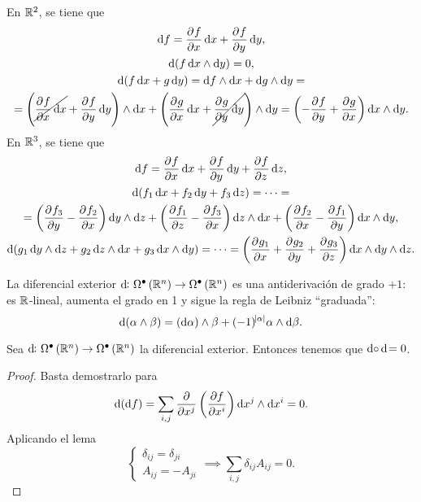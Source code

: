 \begin{example}
    En $\mathbb{R}^2$, se tiene que
    \begin{gather*}
        \dif f = \pdv{f}{x} \dif x + \pdv{f}{y} \dif y, \\
        \dif \left( f \dif x \wedge \dif y \right) = 0, \\
        \dif\left( f \dif x + g \dif y \right) = \dif f \wedge \dif x + \dif g \wedge \dif y =\\=
        \left( \cancel{\pdv{f}{x} \dif x} + \pdv{f}{y} \dif y \right) \wedge \dif x + \left( \pdv{g}{x} \dif x + \cancel{\pdv{g}{y} \dif y} \right)\wedge \dif y =
        \left( -\pdv{f}{y} + \pdv{g}{x} \right) \dif x \wedge \dif y.
    \end{gather*}
    En $\mathbb{R}^3$, se tiene que
    \begin{gather*}
        \dif f = \pdv{f}{x} \dif x + \pdv{f}{y} \dif y + \pdv{f}{z} \dif z, \\
        \dif \left( f_1 \dif x + f_2 \dif y + f_3 \dif z \right) = \cdots = \\ = \left( \pdv{f_3}{y} - \pdv{f_2}{x} \right)\dif y \wedge \dif z +
        \left( \pdv{f_1}{z} - \pdv{f_3}{x} \right) \dif z \wedge \dif x + \left( \pdv{f_2}{x} - \pdv{f_1}{y} \right)\dif x \wedge \dif y, \\
        \dif \left( g_1 \dif y \wedge \dif z +  g_2 \dif z \wedge \dif x + g_3 \dif x \wedge \dif y \right) = \cdots =
        \left( \pdv{g_1}{x} + \pdv{g_2}{y} + \pdv{g_3}{z} \right) \dif x \wedge \dif y \wedge \dif z.
    \end{gather*}
\end{example}

\begin{obs}
    La diferencial exterior $\dif \colon \Omega^\bullet \left( \real^n \right) \to \Omega^\bullet \left( \real^n \right)$ es una antiderivación de
    grado $+1$: es $\mathbb{R}$-lineal, aumenta el grado en 1 y sigue la regla de Leibniz ``graduada'':
    \[
        \dif \left( \alpha \wedge \beta \right) = \left( \dif \alpha \right) \wedge \beta + (-1)^{\abs{\alpha}} \alpha \wedge \dif \beta.
    \]
\end{obs}

\begin{prop}\label{prop:d-cuadrado}
    Sea $\dif \colon \Omega^\bullet \left( \real^n \right) \to \Omega^\bullet \left( \real^n \right)$ la diferencial exterior. Entonces tenemos que $\dif \circ \dif = 0$.
\end{prop}
\begin{proof}
    Basta demostrarlo para
    \[
        \dif \left( \dif f \right) = \sum_{i,j} \frac{\partial}{\partial x^j} \left( \frac{\partial f}{\partial x^i} \right) \dif x^j \wedge \dif x^i = 0.
    \]
    Aplicando el lema
    \[
        \begin{cases}
            \delta_{ij} = \delta_{ji} \\ A_{ij} = - A_{ji}
        \end{cases} \implies
        \sum_{i,j} \delta_{ij} A_{ij} = 0.
    \]
\end{proof}


